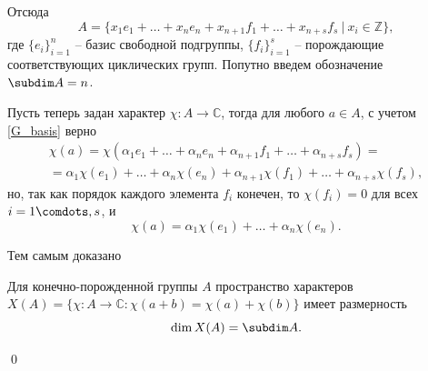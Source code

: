     Отсюда
    \begin{equation}\label{G_basis}
        A = 
        \{x_1 e_1 + \ldots + x_n e_n + x_{n+1} f_1 + \ldots + x_{n+s} f_s 
        \:|\: x_i \in \mathbb{Z}\},
    \end{equation}
    где $\{e_i\}_{i=1}^n$ -- базис свободной подгруппы, $\{f_i\}_{i=1}^s$ -- 
    порождающие соответствующих циклических групп. Попутно введем обозначение 
    $\subdim A = n$.

    Пусть теперь задан характер $\chi: A \to \mathbb{C}$, тогда для любого 
    $a \in A$, с учетом \eqref{G_basis} верно
    \begin{multline*}
        \chi(a) = \chi(\alpha_1 e_1 + \ldots + \alpha_n e_n 
        + \alpha_{n+1} f_1 + \ldots + \alpha_{n+s} f_s ) = \\
        = \alpha_1 \chi(e_1) + \ldots + \alpha_n \chi(e_n) 
        + \alpha_{n+1} \chi(f_1) + \ldots + \alpha_{n+s} \chi(f_s),
    \end{multline*}
    но, так как порядок каждого элемента $f_i$ конечен, то $\chi(f_i) = 0$ для 
    всех $i=1 \comdots, s$, и
    \begin{equation}\label{chi_decomp}
        \chi(a) = \alpha_1 \chi(e_1) + \ldots + \alpha_n \chi(e_n).
    \end{equation}
    
    Тем самым доказано
    \begin{statement}
        Для конечно-порожденной группы $A$ пространство характеров 
        $X(A) = \{\chi: A \to \mathbb{C}: 
        \chi(a + b) = \chi(a) + \chi(b)\}$ имеет размерность
        \begin{equation}
            \dim X(A) = \subdim A.
        \end{equation}
    \end{statement}

\qed